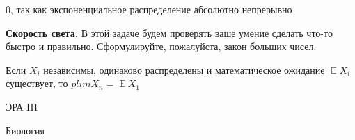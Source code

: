 \documentclass[12pt, addpoints]{exam} %
\DeclareMathOperator{\E}{\mathbb{E}}
\begin{document}
\begin{questions}
\begin{solution}
0, так как экспоненциальное распределение абсолютно непрерывно
\end{solution}

\question  \textbf{Скорость света.} В этой задаче будем проверять ваше умение сделать что-то быстро и правильно. Сформулируйте, пожалуйста, закон больших чисел.

\begin{solution}
Если $X_i$ независимы, одинаково распределены и математическое ожидание $\E X_i$ существует, то $ plim \bar{X_n}=\E X_1 $
\end{solution}



\end{questions}

\newpage
\begin{center}
ЭРА III
\end{center}

\begin{center}
Биология
\end{center}
\end{document}
